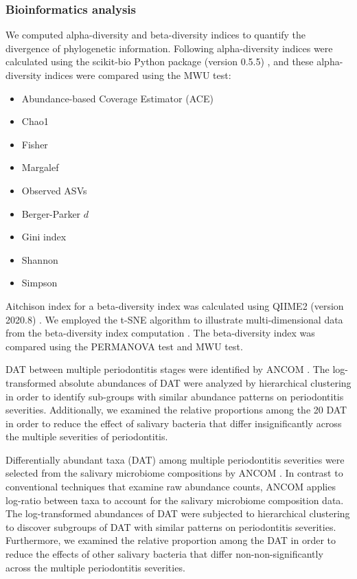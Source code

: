 \documentclass[11pt, a4paper, onecolumn, oneside]{report}
\begin{document}
            \subsubsection{Bioinformatics analysis}
                We computed alpha-diversity and beta-diversity indices to quantify the divergence of phylogenetic information. Following alpha-diversity indices were calculated using the scikit-bio Python package (version 0.5.5) \cite{scikit-bio-1}, and these alpha-diversity indices were compared using the MWU test:
                \begin{itemize}[noitemsep, nolistsep]
                    \item Abundance-based Coverage Estimator (ACE) \cite{ACE-1}
                    \item Chao1 \cite{chao1-1}
                    \item Fisher \cite{fisher-1}
                    \item Margalef \cite{margalef-1}
                    \item Observed ASVs \cite{observed-ASVs-1}
                    \item Berger-Parker $d$ \cite{Berger-1}
                    \item Gini index \cite{Gini-1}
                    \item Shannon \cite{Shannon-1}
                    \item Simpson \cite{Simpson-1}
                \end{itemize}

                Aitchison index for a beta-diversity index was calculated using QIIME2 (version 2020.8) \cite{Aitchison-1, QIIME2-1}. We employed the t-SNE algorithm to illustrate multi-dimensional data from the beta-diversity index computation \cite{tSNE-1}. The beta-diversity index was compared using the PERMANOVA test \cite{PERMANOVA-1, PERMANOVA-2} and MWU test.

                DAT between multiple periodontitis stages were identified by ANCOM \cite{ANCOM-1}. The log-transformed absolute abundances of DAT were analyzed by hierarchical clustering in order to identify sub-groups with similar abundance patterns on periodontitis severities. Additionally, we examined the relative proportions among the 20 DAT in order to reduce the effect of salivary bacteria that differ insignificantly across the multiple severities of periodontitis.

                Differentially abundant taxa (DAT) among multiple periodontitis severities were selected from the salivary microbiome compositions by ANCOM \cite{ANCOM-1}. In contrast to conventional techniques that examine raw abundance counts, ANCOM applies log-ratio between taxa to account for the salivary microbiome composition data. The log-transformed abundances of DAT were subjected to hierarchical clustering to discover subgroups of DAT with similar patterns on periodontitis severities. Furthermore, we examined the relative proportion among the DAT in order to reduce the effects of other salivary bacteria that differ non-non-significantly across the multiple periodontitis severities.
\end{document}
